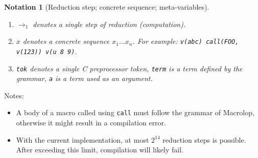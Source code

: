 \documentclass[a4paper, 12pt]{article}
\theoremstyle{break}
\newtheorem{notation}{Notation}
\begin{document}
\begin{notation}[Reduction step; concrete sequence; meta-variables]
    \begin{enumerate}
        \item $\to_1$ denotes a single step of reduction (computation).

        \item $\overline{x}$ denotes a concrete sequence $x_1 \ldots x_n$. For example:
        \texttt{v(abc) call(FOO, v(123)) v(u 8 9)}.

        \item \texttt{tok} denotes a single C preprocessor token, \texttt{term} is a term defined
    by the grammar, \texttt{a} is a term used as an argument.
    \end{enumerate}
\end{notation}

Notes:

\begin{itemize}
    \item A body of a macro called using \texttt{call} must follow the grammar of
    Macrolop, otherwise it might result in a compilation error.
    \item With the current implementation, at most $2^{14}$ reduction steps is
    possible. After exceeding this limit, compilation will likely fail.
\end{itemize}
\end{document}
